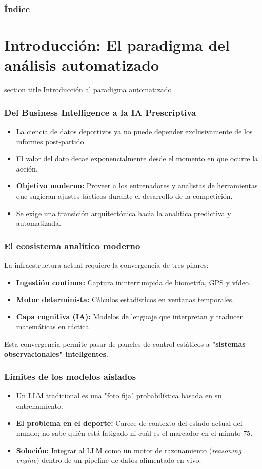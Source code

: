 \documentclass[aspectratio=169]{beamer}
\newcommand{\sectionpagetitle}[1]{
\begin{frame}
	\vspace{1cm}
	\begin{beamercolorbox}[sep=8pt,center,wd=\textwidth]{section title}
		\usebeamerfont{section title}#1\par
	\end{beamercolorbox}
\end{frame}
}
\begin{document}
\begin{frame}\frametitle{Índice}
\tableofcontents
\end{frame}

\section{Introducción: El paradigma del análisis automatizado}
\sectionpagetitle{Introducción al paradigma automatizado}

\begin{frame}\frametitle{Del Business Intelligence a la IA Prescriptiva}
\begin{itemize}
    \item La ciencia de datos deportivos ya no puede depender exclusivamente de los informes post-partido.
    \item El valor del dato decae exponencialmente desde el momento en que ocurre la acción.
    \item \textbf{Objetivo moderno:} Proveer a los entrenadores y analistas de herramientas que sugieran ajustes tácticos durante el desarrollo de la competición.
    \item Se exige una transición arquitectónica hacia la analítica predictiva y automatizada.
\end{itemize}
\end{frame}

\begin{frame}\frametitle{El ecosistema analítico moderno}
La infraestructura actual requiere la convergencia de tres pilares:
\begin{itemize}
    \item \textbf{Ingestión continua:} Captura ininterrumpida de biometría, GPS y vídeo.
    \item \textbf{Motor determinista:} Cálculos estadísticos en ventanas temporales.
    \item \textbf{Capa cognitiva (IA):} Modelos de lenguaje que interpretan y traducen matemáticas en táctica.
\end{itemize}
Esta convergencia permite pasar de paneles de control estáticos a \textbf{"sistemas observacionales" inteligentes}.
\end{frame}

\begin{frame}\frametitle{Límites de los modelos aislados}
\begin{itemize}
    \item Un LLM tradicional es una "foto fija" probabilística basada en su entrenamiento.
    \item \textbf{El problema en el deporte:} Carece de contexto del estado actual del mundo; no sabe quién está fatigado ni cuál es el marcador en el minuto 75.
    \item \textbf{Solución:} Integrar al LLM como un motor de razonamiento (\textit{reasoning engine}) dentro de un pipeline de datos alimentado en vivo.
\end{itemize}
\end{frame}
\end{document}
